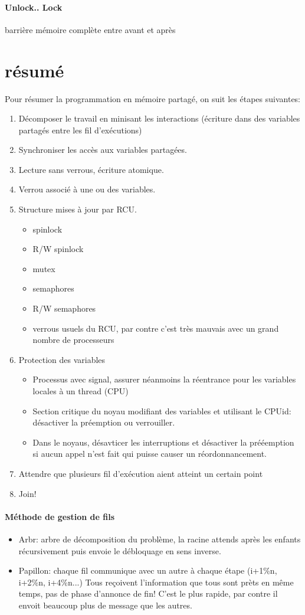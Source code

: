 \documentclass[oneside]{book}
\begin{document}
\paragraph{Unlock.. Lock} barrière mémoire complète entre avant et après
\section{résumé}
Pour résumer la programmation en mémoire partagé, on suit les étapes suivantes:
\begin{enumerate}
\item Décomposer le travail en minisant les interactions (écriture dans des variables partagés entre les fil d'exécutions)
\item Synchroniser les accès aux variables partagées.
\item Lecture sans verrous, écriture atomique.
\item Verrou associé à une ou des variables.
\item Structure mises à jour par RCU.
\begin{itemize}
\item spinlock
\item R/W spinlock
\item mutex
\item semaphores
\item R/W semaphores
\item verrous usuels du RCU, par contre c'est très mauvais avec un grand nombre de processeurs
\end{itemize}
\item Protection des variables
\begin{itemize}
\item Processus avec signal, assurer néanmoins la réentrance pour les variables locales à un thread (CPU)
\item Section critique du noyau modifiant des variables et utilisant le CPUid: désactiver la préemption ou verrouiller. 
\item Dans le noyaus, désavticer les interruptions et désactiver la prééemption si aucun appel n'est fait qui puisse causer un réordonnancement.
\end{itemize}
\item Attendre que plusieurs fil d'exécution aient atteint un certain point
\item Join!
\end{enumerate}
\paragraph{Méthode de gestion de fils}
\begin{itemize}
\item Arbr: arbre de décomposition du problème, la racine attends après les enfants récursivement puis envoie le débloquage en sens inverse.

\item Papillon: chaque fil communique avec un autre à chaque étape (i+1\%n, i+2\%n, i+4\%n...) Tous reçoivent l'information que tous sont prèts en même temps, pas de phase d'annonce de fin! C'est le plus rapide, par contre il envoit beaucoup plus de message que les autres.
\end{itemize}
\end{document}
